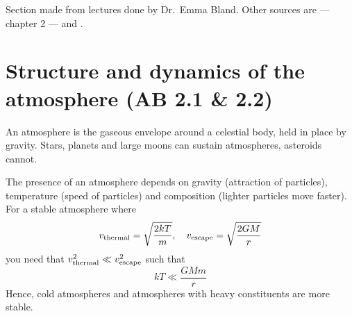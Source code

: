 \begin{remark}
    Section made from lectures done by Dr.\ Emma Bland. Other sources are \citet{BrekkeAsgeir2013Potu} --- chapter 2 --- and \citet{NesseTyssoy2010Cium}.
\end{remark}
\section[Structure and dynamics of the atmosphere]{Structure and dynamics of the atmosphere (AB 2.1 \& 2.2)}
\begin{definition}[Atmosphere]\label{def:atmosphere}
    An atmosphere is the gaseous envelope around a celestial body, held in place by gravity. Stars, planets and large moons can sustain atmospheres, asteroids cannot.
\end{definition}
The presence of an atmosphere depends on gravity (attraction of particles), temperature (speed of particles) and composition (lighter particles move faster). For a stable atmosphere where
\begin{equation*}
    v_{\textnormal{thermal}}=\sqrt{\frac{2kT}{m}},\quad v_{\textnormal{escape}}=\sqrt{\frac{2GM}{r}}
\end{equation*}
you need that \(v_{\textnormal{thermal}}^2\ll v_{\textnormal{escape}}^2\) such that
\begin{equation*}
    kT\ll\frac{GMm}{r}
\end{equation*}
Hence, cold atmospheres and atmospheres with heavy constituents are more stable.

